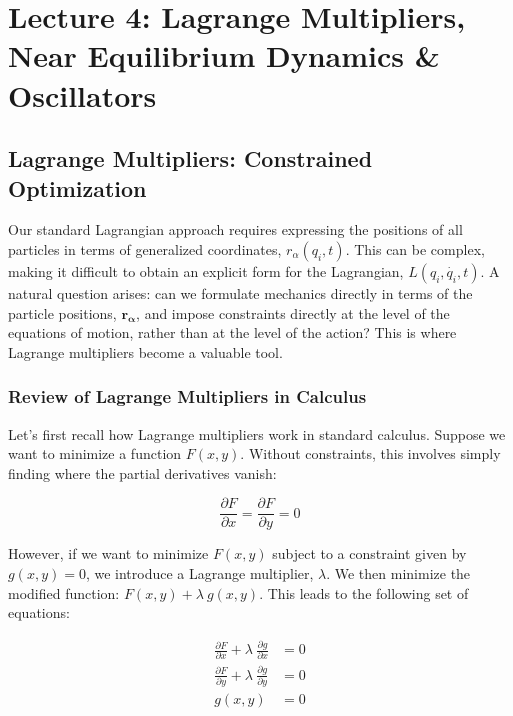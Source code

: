 \section{Lecture 4: Lagrange Multipliers, Near Equilibrium Dynamics \& Oscillators}

\subsection{Lagrange Multipliers: Constrained Optimization}

Our standard Lagrangian approach requires expressing the positions of all particles in 
terms of generalized coordinates, $r_\alpha\left(q_i, t\right)$. This can be complex, 
making it difficult to obtain an explicit form for the Lagrangian, 
$L\left(q_i, \dot{q_i}, t\right)$. A natural question arises: can we formulate mechanics 
directly in terms of the particle positions, $\mathbf{r_\alpha}$, and impose constraints
directly at the level of the equations of motion, rather than at the level of the action?
This is where Lagrange multipliers become a valuable tool.

\subsubsection{Review of Lagrange Multipliers in Calculus}

Let's first recall how Lagrange multipliers work in standard calculus. Suppose we want to 
minimize a function $F\left(x, y\right)$. Without constraints, this involves simply 
finding where the partial derivatives vanish:

\begin{equation}
    \frac{\partial F}{\partial x} = \frac{\partial F}{\partial y} = 0
\end{equation}

However, if we want to minimize $F\left(x, y\right)$ subject to a constraint given by 
$g\left(x, y\right) = 0$, we introduce a Lagrange multiplier, $\lambda$.  We then 
minimize the modified function: $F\left(x, y\right) + \lambda \ g\left(x, y\right)$. This 
leads to the following set of equations:

\begin{align*}
    \frac{\partial F}{\partial x} + \lambda \ \frac{\partial g}{\partial x} &= 0 \\
    \frac{\partial F}{\partial y} + \lambda \ \frac{\partial g}{\partial y} &= 0 \\
    g\left(x, y\right) &= 0 \\
\end{align*}

